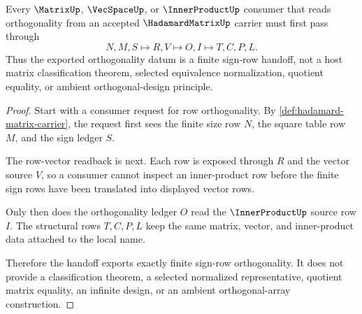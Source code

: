 \begin{theorem}
\label{thm:hadamard-matrix-orthogonality-handoff}
Every $\MatrixUp$, $\VecSpaceUp$, or $\InnerProductUp$ consumer that reads orthogonality from an accepted $\HadamardMatrixUp$ carrier must first pass through
$$
N,M,S \longmapsto R,V \longmapsto O,I \longmapsto T,C,P,L .
$$
Thus the exported orthogonality datum is a finite sign-row handoff, not a host matrix classification theorem, selected equivalence normalization, quotient equality, or ambient orthogonal-design principle.
\end{theorem}
\begin{proof}
Start with a consumer request for row orthogonality. By \autoref{def:hadamard-matrix-carrier}, the request first sees the finite size row $N$, the square table row $M$, and the sign ledger $S$.

The row-vector readback is next. Each row is exposed through $R$ and the vector source $V$, so a consumer cannot inspect an inner-product row before the finite sign rows have been translated into displayed vector rows.

Only then does the orthogonality ledger $O$ read the $\InnerProductUp$ source row $I$. The structural rows $T,C,P,L$ keep the same matrix, vector, and inner-product data attached to the local name.

Therefore the handoff exports exactly finite sign-row orthogonality. It does not provide a classification theorem, a selected normalized representative, quotient matrix equality, an infinite design, or an ambient orthogonal-array construction.
\end{proof}


\begin{closurestatus}{\HadamardMatrixUp}
  \theoryclosure{\seedClosure}
  \formalstatus{\unformalizedV}
\end{closurestatus}
